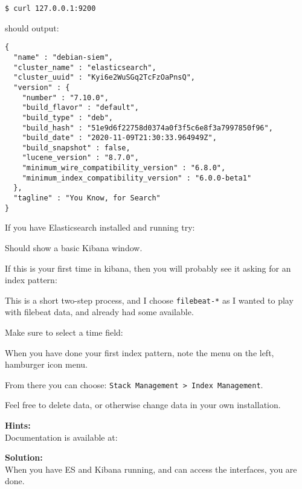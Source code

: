 \documentclass[a4paper,11pt,notitlepage]{report}
\begin{document}
\begin{verbatim}
$ curl 127.0.0.1:9200
\end{verbatim}
should output:
\begin{verbatim}
{
  "name" : "debian-siem",
  "cluster_name" : "elasticsearch",
  "cluster_uuid" : "Kyi6e2WuSGq2TcFzOaPnsQ",
  "version" : {
    "number" : "7.10.0",
    "build_flavor" : "default",
    "build_type" : "deb",
    "build_hash" : "51e9d6f22758d0374a0f3f5c6e8f3a7997850f96",
    "build_date" : "2020-11-09T21:30:33.964949Z",
    "build_snapshot" : false,
    "lucene_version" : "8.7.0",
    "minimum_wire_compatibility_version" : "6.8.0",
    "minimum_index_compatibility_version" : "6.0.0-beta1"
  },
  "tagline" : "You Know, for Search"
}
\end{verbatim}


If you have Elasticsearch installed and running try: 

Should show a basic Kibana window.


If this is your first time in kibana, then you will probably see it asking for an index pattern:

This is a short two-step process, and I choose \verb+filebeat-*+ as I wanted to play with filebeat data, and already had some available.


Make sure to select a time field:


When you have done your first index pattern, note the menu on the left, hamburger icon menu.

From there you can choose: \verb+Stack Management > Index Management+.


Feel free to delete data, or otherwise change data in your own installation.



{\bf Hints:}\\
Documentation is available at:\\

{\bf Solution:}\\
When you have ES and Kibana running, and can access the interfaces, you are done.
\end{document}
